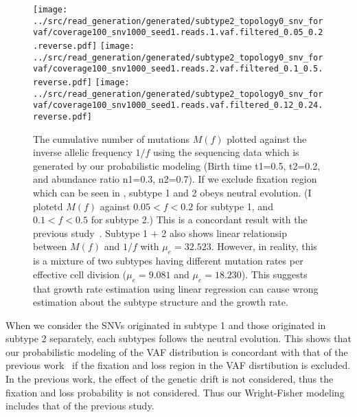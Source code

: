 \documentclass{article}
\begin{document}
\begin{figure}[H]
 \texttt{[image: ../src/read\_generation/generated/subtype2\_topology0\_snv\_forvaf/coverage100\_snv1000\_seed1.reads.1.vaf.filtered\_0.05\_0.2.reverse.pdf]}
 \texttt{[image: ../src/read\_generation/generated/subtype2\_topology0\_snv\_forvaf/coverage100\_snv1000\_seed1.reads.2.vaf.filtered\_0.1\_0.5.reverse.pdf]}
 \texttt{[image: ../src/read\_generation/generated/subtype2\_topology0\_snv\_forvaf/coverage100\_snv1000\_seed1.reads.vaf.filtered\_0.12\_0.24.reverse.pdf]}
 \caption{The cumulative number of mutations $M(f)$ plotted against the inverse allelic frequency $1/f$ using the sequencing data which is generated by our probabilistic modeling (Birth time t1=0.5, t2=0.2, and abundance ratio n1=0.3,  n2=0.7). If we exclude fixation region which can be seen in , subtype 1 and 2 obeys neutral evolution. (I plotetd $M(f)$ against $0.05 < f < 0.2$ for subtype 1, and $0.1 < f < 0.5$ for subtype 2.) This is a concordant result with the previous study~\cite{williams2016identification}. Subtype 1 + 2 also shows linear relationsip between $M(f)$ and $1/f$ with $\mu_e = 32.523$.  However, in reality, this is a mixture of two subtypes having different mutation rates per effective cell division ($\mu_e = 9.081$ and $\mu_e=18.230$). This suggests that growth rate estimation using linear regression can cause wrong estimation about the subtype structure and the growth rate.}
 \label{inverse_VAF_cumulative_generated}
\end{figure}

When we consider the SNVs originated in subtype 1 and those originated in subtype 2 separately, each subtypes follows the neutral evolution.
This shows that our probabilistic modeling of the VAF distribution is concordant with that of the previous work~\cite{williams2016identification} if the fixation and loss region in the VAF disrtibution is excluded. In the previous work, the effect of the genetic drift is not considered, thus the fixation and loss probability is not considered. Thus our Wright-Fisher modeling includes that of the previous study.
\end{document}
